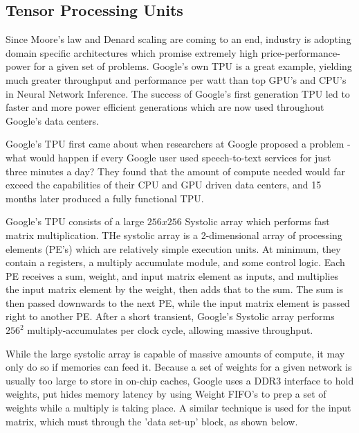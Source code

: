 \documentclass[11pt, conference, onecolumn]{IEEEtran}
\begin{document}
\subsection{Tensor Processing Units}
    Since Moore's law and Denard scaling are coming to an end, industry is adopting
    domain specific architectures which promise extremely high price-performance-power for
    a given set of problems. Google's own TPU is a great example, yielding much greater
    throughput and performance per watt than top GPU's and CPU's in Neural Network
    Inference. The success of Google's first generation TPU led to faster and more power
    efficient generations which are now used throughout Google's data centers.

    Google's TPU first came about when researchers at Google proposed a problem - what
    would happen if every Google user used speech-to-text services for just three minutes
    a day? They found that the amount of compute needed would far exceed the capabilities
    of their CPU and GPU driven data centers, and 15 months later produced a fully
    functional TPU.

    Google's TPU consists of a large $256 x 256$ Systolic array which performs fast matrix
    multiplication. THe systolic array is a 2-dimensional array of processing elements
    (PE's) which are relatively simple execution units. At minimum, they contain a
    registers, a multiply accumulate module, and some control logic. Each PE receives a
    sum, weight, and input matrix element as inputs, and multiplies the input matrix
    element by the weight, then adds that to the sum. The sum is then passed downwards
    to the next PE, while the input matrix element is passed right to another PE. After
    a short transient, Google's Systolic array performs $256^2$ multiply-accumulates per
    clock cycle, allowing massive throughput.

    While the large systolic array is capable of massive amounts of compute, it may only
    do so if memories can feed it. Because a set of weights for a given network is usually
    too large to store in on-chip caches, Google uses a DDR3 interface to hold weights,
    put hides memory latency by using Weight FIFO's to prep a set of weights while a
    multiply is taking place. A similar technique is used for the input matrix, which must
    through the 'data set-up' block, as shown below.
\end{document}
